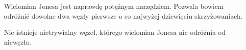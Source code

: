 Wielomian Jonesa jest naprawdę potężnym narzędziem.
Pozwala bowiem odróżnić dowolne dwa węzły pierwsze o co najwyżej dziewięciu skrzyżowaniach.

\begin{hipoteza}
Nie istnieje nietrywialny węzeł, którego wielomian Jonesa nie odróżnia od niewęzła.
\end{hipoteza}

